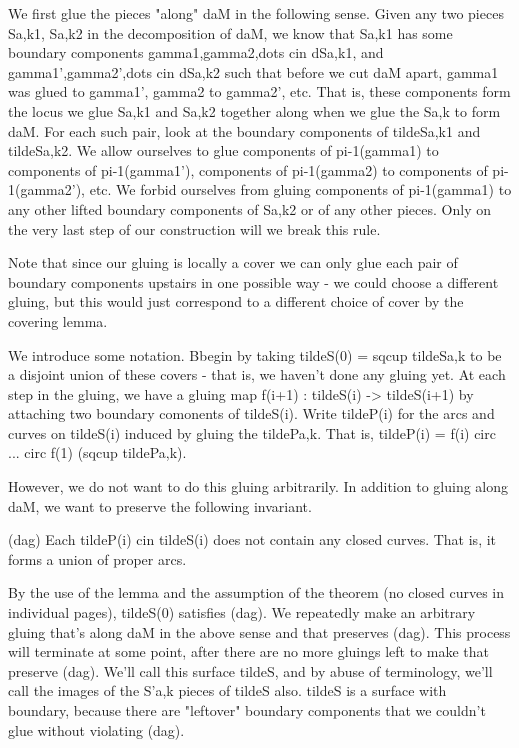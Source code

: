 \documentclass[12pt]{amsart}
\theoremstyle{definition}
\theoremstyle{remark}
\begin{document}
We first glue the pieces "along" daM in the following sense. Given any two
pieces Sa,k1, Sa,k2 in the decomposition of daM, we know that Sa,k1 has some
boundary components gamma1,gamma2,dots cin dSa,k1, and gamma1',gamma2',dots cin
dSa,k2 such that before we cut daM apart, gamma1 was glued to gamma1', gamma2
to gamma2', etc.  That is, these components form the locus we glue Sa,k1 and
Sa,k2 together along when we glue the Sa,k to form daM.  For each such pair,
look at the boundary components of tildeSa,k1 and tildeSa,k2.  We allow
ourselves to glue components of pi-1(gamma1) to components of pi-1(gamma1'),
components of pi-1(gamma2) to components of pi-1(gamma2'), etc. We forbid
ourselves from gluing components of pi-1(gamma1) to any other lifted boundary
components of Sa,k2 or of any other pieces. Only on the very last step of our
construction will we break this rule.

Note that since our gluing is locally a cover we can only glue each pair of
boundary components upstairs in one possible way - we could choose a different
gluing, but this would just correspond to a different choice of cover by the
covering lemma.

We introduce some notation. Bbegin by taking tildeS(0) = sqcup tildeSa,k to be
a disjoint union of these covers - that is, we haven't done any gluing yet. At
each step in the gluing, we have a gluing map f(i+1) : tildeS(i) -> tildeS(i+1)
by attaching two boundary comonents of tildeS(i). Write tildeP(i) for the arcs
and curves on tildeS(i) induced by gluing the tildePa,k. That is, tildeP(i)
= f(i) circ ...  circ f(1) (sqcup tildePa,k).

However, we do not want to do this gluing arbitrarily.  In addition to gluing
along daM, we want to preserve the following invariant.

(dag) Each tildeP(i) cin tildeS(i) does not contain any closed curves. That is,
it forms a union of proper arcs.

%

By the use of the lemma and the assumption of the theorem (no closed curves in
individual pages), tildeS(0) satisfies (dag).  We repeatedly make an arbitrary
gluing that's along daM in the above sense and that preserves (dag).  This
process will terminate at some point, after there are no more gluings left to
make that preserve (dag). We'll call this surface tildeS, and by abuse of
terminology, we'll call the images of the S'a,k pieces of tildeS also. tildeS
is a surface with boundary, because there are "leftover" boundary components
that we couldn't glue without violating (dag).
\end{document}
